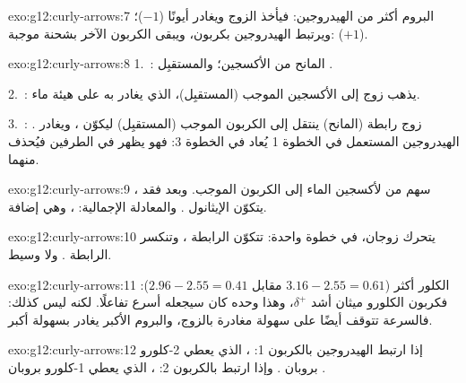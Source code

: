\begin{solution}{exo:g12:curly-arrows:7}
البروم أكثر  من الهيدروجين: فيأخذ الزوج
ويغادر أيونًا  ($-1$)؛ ويرتبط الهيدروجين بكربون، ويبقى الكربون
الآخر بشحنة موجبة:  ($+1$).
\end{solution}

\begin{solution}{exo:g12:curly-arrows:8}
1.~: المانح  من
الأكسجين؛ والمستقبِل .\par 2.~: يذهب
زوج  إلى الأكسجين الموجب (المستقبِل)، الذي يغادر به
على هيئة ماء.\par 3.~: زوج رابطة 
(المانح) ينتقل إلى الكربون الموجب (المستقبِل) ليكوّن ،
ويغادر .  الهيدروجين المستعمل في الخطوة 1 يُعاد في الخطوة
3: فهو يظهر في الطرفين فيُحذف منهما.
\end{solution}

\begin{solution}{exo:g12:curly-arrows:9}
سهم من  لأكسجين الماء إلى الكربون الموجب.
وبعد فقد ، يتكوّن الإيثانول . والمعادلة الإجمالية:
، وهي إضافة.
\end{solution}

\begin{solution}{exo:g12:curly-arrows:10}
يتحرك زوجان، في خطوة واحدة: تتكوّن الرابطة ، وتنكسر الرابطة
. ولا وسيط.
\end{solution}

\begin{solution}{exo:g12:curly-arrows:11}
الكلور أكثر  ($3.16 - 2.55 = 0.61$ مقابل
$2.96 - 2.55 = 0.41$): فكربون الكلورو ميثان أشد
$\delta^+$، وهذا وحده كان سيجعله أسرع تفاعلًا. لكنه ليس كذلك: فالسرعة
تتوقف أيضًا على سهولة مغادرة  بالزوج، والبروم
الأكبر يغادر بسهولة أكبر.
\end{solution}

\begin{solution}{exo:g12:curly-arrows:12}
إذا ارتبط الهيدروجين بالكربون 1: ، الذي يعطي
2-كلورو بروبان . وإذا ارتبط بالكربون 2:
، الذي يعطي 1-كلورو بروبان .
\end{solution}

